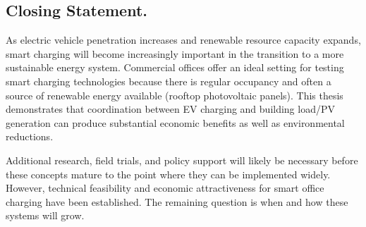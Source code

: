 \subsection{Closing Statement. }

As electric vehicle penetration increases and renewable resource capacity expands, smart charging will become increasingly important in the transition to a more sustainable energy system. Commercial offices offer an ideal setting for testing smart charging technologies because there is regular occupancy and often a source of renewable energy available (rooftop photovoltaic panels). This thesis demonstrates that coordination between EV charging and building load/PV generation can produce substantial economic benefits as well as environmental reductions.

Additional research, field trials, and policy support will likely be necessary before these concepts mature to the point where they can be implemented widely. However, technical feasibility and economic attractiveness for smart office charging have been established. The remaining question is when and how these systems will grow.